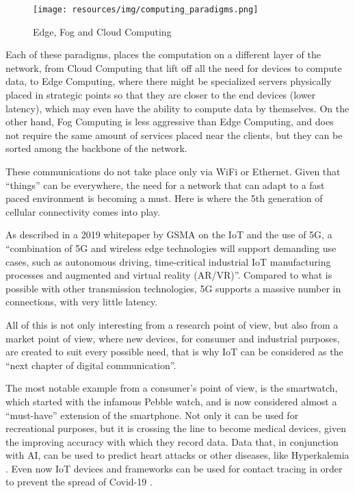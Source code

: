 			\begin{figure}[h]
				\centering
				\texttt{[image: resources/img/computing\_paradigms.png]}
				\caption{Edge, Fog and Cloud Computing}
				\label{computing_paradigms}
			\end{figure}
		
			Each of these paradigms, places the computation on a different layer of the network, from Cloud Computing that lift off all the need for devices to compute data, to Edge Computing, where there might be specialized servers physically placed in strategic points so that they are closer to the end devices (lower latency), which may even have the ability to compute data by themselves.
			On the other hand, Fog Computing is less aggressive than Edge Computing, and does not require the same amount of services placed near the clients, but they can be sorted among the backbone of the network.
			
			These communications do not take place only via WiFi or Ethernet.
			Given that ``things'' can be everywhere, the need for a network that can adapt to a fast paced environment is becoming a must.
			Here is where the 5th generation of cellular connectivity comes into play.
			
			As described in a 2019 whitepaper by GSMA on the IoT and the use of 5G, a ``combination of 5G and wireless edge technologies will support demanding  use cases, such as autonomous driving, time-critical industrial IoT manufacturing processes and  augmented and virtual reality (AR/VR)''\cite{IoT_5g_era}.
			Compared to what is possible with other transmission technologies, 5G supports a massive number in connections, with very little latency.
				
			All of this is not only interesting from a research point of view, but also from a market point of view, where new devices, for consumer and industrial purposes, are created to suit every possible need, that is why IoT can be considered as the ``next chapter of digital communication''.
			
			The most notable example from a consumer's point of view, is the smartwatch, which started with the infamous Pebble watch, and is now considered almost a ``must-have'' extension of the smartphone.
			Not only it can be used for recreational purposes, but it is crossing the line to become medical devices, given the improving accuracy with which they record data.
			Data that, in conjunction with AI, can be used to predict heart attacks \cite{7946780} or other diseases, like Hyperkalemia \cite{HYPERKALEMIA}.
			Even now IoT devices and frameworks can be used for contact tracing in order to prevent the spread of Covid-19 \cite{9181512}.
			
